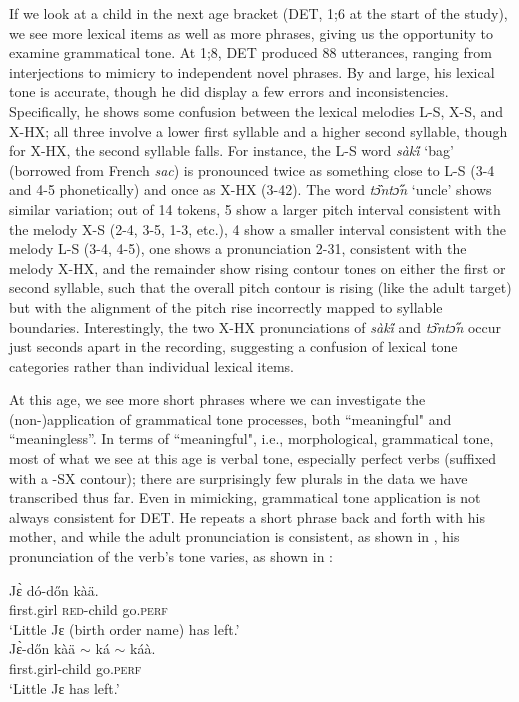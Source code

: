 \documentclass[output=paper,colorlinks,citecolor=brown,
]{langscibook}
\begin{document}
If we look at a child in the next age bracket (DET, 1;6 at the start of the study), we see more lexical items as well as more phrases, giving us the opportunity to examine grammatical tone. At 1;8, DET produced 88 utterances, ranging from interjections to mimicry to independent novel phrases. By and large, his lexical tone is accurate, though he did display a few errors and inconsistencies. Specifically, he shows some confusion between the lexical melodies L-S, X-S, and X-HX; all three involve a lower first syllable and a higher second syllable, though for X-HX, the second syllable falls. For instance, the L-S word \textit{sàki̋} `bag' (borrowed from French \textit{sac}) is pronounced twice as something close to L-S (3-4 and 4-5 phonetically) and once as X-HX (3-42). The word \textit{tɔ̏ntɔ̋n} `uncle' shows similar variation; out of 14 tokens, 5 show a larger pitch interval consistent with the melody X-S (2-4, 3-5, 1-3, etc.), 4 show a smaller interval consistent with the melody L-S (3-4, 4-5), one shows a pronunciation 2-31, consistent with the melody X-HX, and the remainder show rising contour tones on either the first or second syllable, such that the overall pitch contour is rising (like the adult target) but with the alignment of the pitch rise incorrectly mapped to syllable boundaries. Interestingly, the two X-HX pronunciations of \textit{sàki̋} and \textit{tɔ̏ntɔ̋n} occur just seconds apart in the recording, suggesting a confusion of lexical tone categories rather than individual lexical items. 

At this age, we see more short phrases where we can investigate the (non-)application of grammatical tone processes, both ``meaningful" and ``meaningless''. In terms of ``meaningful", i.e., morphological, grammatical tone, most of what we see at this age is verbal tone, especially perfect verbs (suffixed with a -SX contour); there are surprisingly few plurals in the data we have transcribed thus far. Even in mimicking, grammatical tone application is not always consistent for DET. He repeats a short phrase back and forth with his mother, and while the adult pronunciation is consistent, as shown in , his pronunciation of the verb's tone varies, as shown in :

\ea
\begin{xlist}
 \ex\label{ex:mcpherson:adult-jedonkaa}
\gll Jɛ̀ dó-dőn kàä. \\
first.girl \textsc{red-}child go.\textsc{perf} \\
\glt `Little Jɛ (birth order name) has left.' \\

\ex\label{ex:mcpherson:child-jedonkaa}
\gll Jɛ̀-dőn kàä $\sim$ \ast ká $\sim$ \ast káà. \\
first.girl-child go.\textsc{perf} \\
\glt `Little Jɛ has left.' \\
 
\end{xlist}
\end{document}
